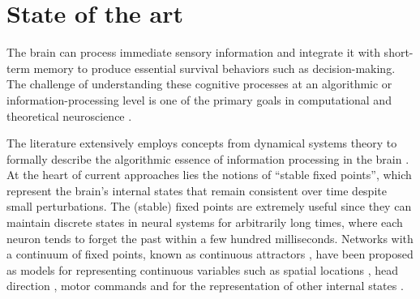\documentclass[12pt,letterpaper, onecolumn]{article}
\theoremstyle{definition}
\theoremstyle{remark}
\begin{document}
\newpage
\section{State of the art}
The brain can process immediate sensory information and integrate it with short-term memory to produce essential survival behaviors such as decision-making.
The challenge of understanding these cognitive processes at an algorithmic or information-processing level is one of the primary goals in computational and theoretical neuroscience \citep{zoltowski2020general, pagan2022, whiteway2019, dyer2023simplest}.

The literature extensively employs concepts from dynamical systems theory to formally describe the algorithmic essence of information processing in the brain \citep{vyas2020computation}.
At the heart of current approaches lies the notions of ``stable fixed points'', which represent the brain's internal states that remain consistent over time despite small perturbations.
The (stable) fixed points are extremely useful since they can maintain discrete states in neural systems for arbitrarily long times, where each neuron tends to forget the past within a few hundred milliseconds. %
Networks with a continuum of fixed points, known as continuous attractors \citep{fung2010, khona2022, wu2008, wu2016}, have been proposed as models for representing continuous variables such as spatial locations \citep{samsonovich1997, stringer2002placecells, yang2022, wimmer2014, guanella2007model, gardner2022toroidal}, head direction \citep{stringer2002headdirection, hulse2020, turner2017, turner2020neuroanatomical, vafidis2022, kim2019generation}, motor commands \citep{stringer2003} and for the representation of other internal states \citep{nair2023, branco2016, seung2000stability}.

%
\end{document}
